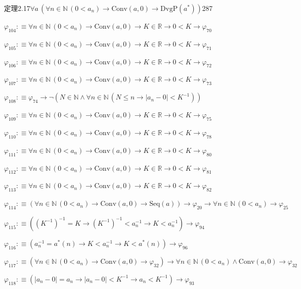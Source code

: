 \begin{fullproof}{定理2.17}{$\forall a\,(\forall n \in \mathbb{N}\,(0 < a_{n}) \to \mathrm{Conv}(a,0) \to \mathrm{DvgP}(a^{\ast}))$}{287}
\begin{abbrevlist}
\item $\varphi_{104} :\equiv \forall n \in \mathbb{N}\,(0 < a_{n}) \to \mathrm{Conv}(a,0) \to K \in \mathbb{R} \to 0 < K \to \varphi_{70}$
\item $\varphi_{105} :\equiv \forall n \in \mathbb{N}\,(0 < a_{n}) \to \mathrm{Conv}(a,0) \to K \in \mathbb{R} \to 0 < K \to \varphi_{71}$
\item $\varphi_{106} :\equiv \forall n \in \mathbb{N}\,(0 < a_{n}) \to \mathrm{Conv}(a,0) \to K \in \mathbb{R} \to 0 < K \to \varphi_{72}$
\item $\varphi_{107} :\equiv \forall n \in \mathbb{N}\,(0 < a_{n}) \to \mathrm{Conv}(a,0) \to K \in \mathbb{R} \to 0 < K \to \varphi_{73}$
\item $\varphi_{108} :\equiv \varphi_{74} \to \neg (N \in \mathbb{N} \land \forall n \in \mathbb{N}\,(N \leq n \to \lvert a_{n} - 0 \rvert < K^{-1}))$
\item $\varphi_{109} :\equiv \forall n \in \mathbb{N}\,(0 < a_{n}) \to \mathrm{Conv}(a,0) \to K \in \mathbb{R} \to 0 < K \to \varphi_{75}$
\item $\varphi_{110} :\equiv \forall n \in \mathbb{N}\,(0 < a_{n}) \to \mathrm{Conv}(a,0) \to K \in \mathbb{R} \to 0 < K \to \varphi_{78}$
\item $\varphi_{111} :\equiv \forall n \in \mathbb{N}\,(0 < a_{n}) \to \mathrm{Conv}(a,0) \to K \in \mathbb{R} \to 0 < K \to \varphi_{80}$
\item $\varphi_{112} :\equiv \forall n \in \mathbb{N}\,(0 < a_{n}) \to \mathrm{Conv}(a,0) \to K \in \mathbb{R} \to 0 < K \to \varphi_{81}$
\item $\varphi_{113} :\equiv \forall n \in \mathbb{N}\,(0 < a_{n}) \to \mathrm{Conv}(a,0) \to K \in \mathbb{R} \to 0 < K \to \varphi_{82}$
\item $\varphi_{114} :\equiv (\forall n \in \mathbb{N}\,(0 < a_{n}) \to \mathrm{Conv}(a,0) \to \mathrm{Seq}(a)) \to \varphi_{20} \to \forall n \in \mathbb{N}\,(0 < a_{n}) \to \varphi_{25}$
\item $\varphi_{115} :\equiv ((K^{-1})^{-1} = K \to (K^{-1})^{-1} < a_{n}^{-1} \to K < a_{n}^{-1}) \to \varphi_{94}$
\item $\varphi_{116} :\equiv (a_{n}^{-1} = a^{\ast}(n) \to K < a_{n}^{-1} \to K < a^{\ast}(n)) \to \varphi_{96}$
\item $\varphi_{117} :\equiv (\forall n \in \mathbb{N}\,(0 < a_{n}) \to \mathrm{Conv}(a,0) \to \varphi_{32}) \to \forall n \in \mathbb{N}\,(0 < a_{n}) \land \mathrm{Conv}(a,0) \to \varphi_{32}$
\item $\varphi_{118} :\equiv (\lvert a_{n} - 0 \rvert = a_{n} \to \lvert a_{n} - 0 \rvert < K^{-1} \to a_{n} < K^{-1}) \to \varphi_{93}$

\end{abbrevlist}
\end{fullproof}
